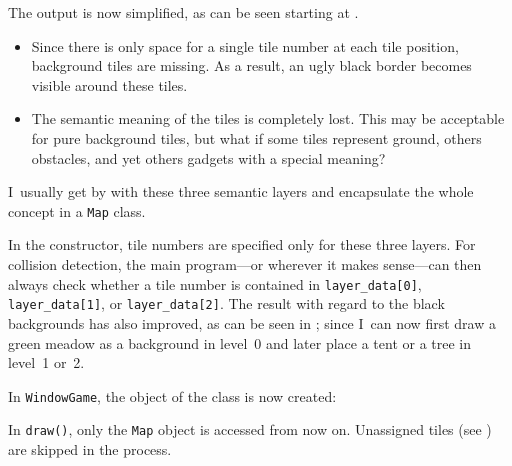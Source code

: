 The output is now simplified, as can be seen starting at .


\begin{warningbox}
\begin{itemize}
	\item Since there is only space for a single tile number at each tile position, background tiles are missing. As a result, an ugly black border becomes visible around these tiles.
	\item The semantic meaning of the tiles is completely lost. This may be acceptable for pure background tiles, but what if some tiles represent ground, others obstacles, and yet others gadgets with a special meaning?
\end{itemize}
\end{warningbox}
I~usually get by with these three semantic layers and encapsulate the whole concept in a \texttt{Map} class.

In the constructor, tile numbers are specified only for these three layers. For collision detection, the main program—or wherever it makes sense—can then always check whether a tile number is contained in \texttt{layer\_data[0]}, \texttt{layer\_data[1]}, or \texttt{layer\_data[2]}. The result with regard to the black backgrounds has also improved, as can be seen in ; since I~can now first draw a green meadow as a background in level~0 and later place a tent or a tree in level~1 or~2.


In \texttt{WindowGame}, the object of the class is now created:


In \texttt{draw()}, only the \texttt{Map} object is accessed from now on. Unassigned tiles (see ) are skipped in the process.



